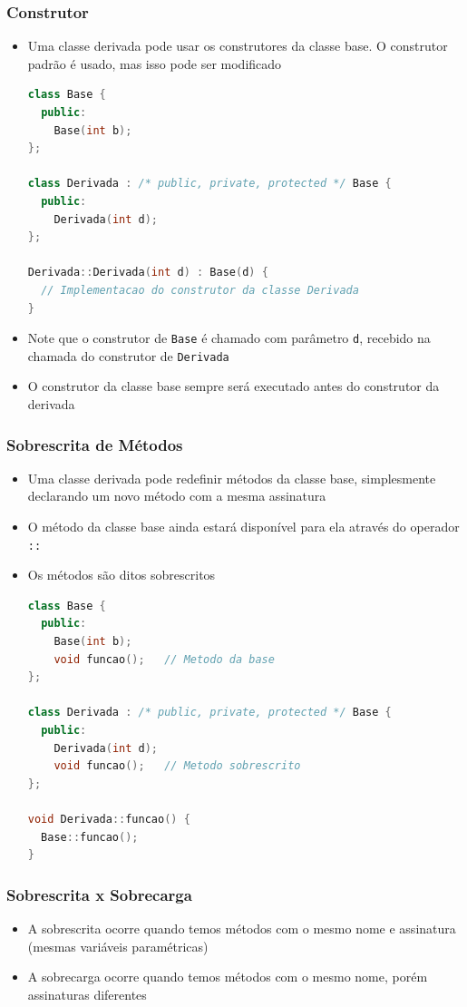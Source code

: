 \documentclass[aspectratio=169]{beamer}
\begin{document}
\begin{frame}[fragile]\frametitle{Construtor}
\begin{itemize}
	\item Uma classe derivada pode usar os construtores da classe base. O construtor padrão é usado, mas isso pode ser modificado
\begin{lstlisting}[language=C++,basicstyle=\ttfamily\tiny]
class Base {
  public:
    Base(int b);
};

class Derivada : /* public, private, protected */ Base {
  public:
    Derivada(int d);
};

Derivada::Derivada(int d) : Base(d) {
  // Implementacao do construtor da classe Derivada
}
\end{lstlisting}
	\item Note que o construtor de \texttt{Base} é chamado com parâmetro \texttt{d}, recebido na chamada do construtor de \texttt{Derivada}
	\item O construtor da classe base sempre será executado antes do construtor da derivada
\end{itemize}
\end{frame}

\begin{frame}[fragile]\frametitle{Sobrescrita de Métodos}
\begin{itemize}
	\item Uma classe derivada pode redefinir métodos da classe base, simplesmente declarando um novo método com a mesma assinatura
	\item O método da classe base ainda estará disponível para ela através do operador \texttt{::}
	\item Os métodos são ditos sobrescritos
\begin{lstlisting}[language=C++,basicstyle=\ttfamily\tiny]
class Base {
  public:
    Base(int b);
    void funcao();   // Metodo da base
};

class Derivada : /* public, private, protected */ Base {
  public:
    Derivada(int d);
    void funcao();   // Metodo sobrescrito
};

void Derivada::funcao() {
  Base::funcao();
}
\end{lstlisting}
\end{itemize}
\end{frame}

\begin{frame}[fragile]\frametitle{Sobrescrita x Sobrecarga}
\begin{itemize}
	\item A sobrescrita ocorre quando temos métodos com o mesmo nome e assinatura (mesmas variáveis paramétricas)
	\item A sobrecarga ocorre quando temos métodos com o mesmo nome, porém assinaturas diferentes
\end{itemize}
\end{frame}
\end{document}
